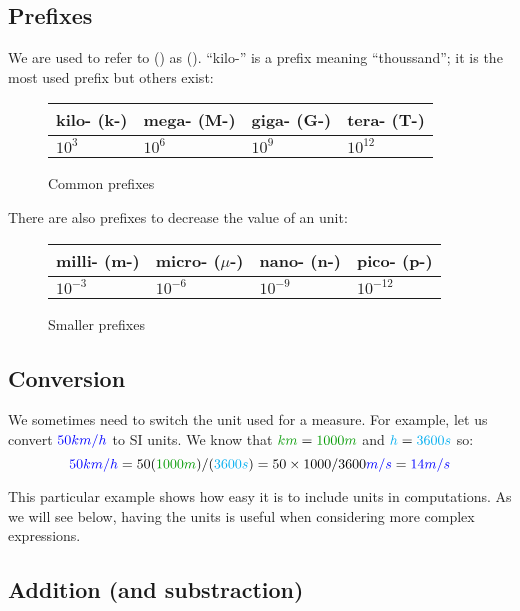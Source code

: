 \subsection{Prefixes}

We are used to refer to  () as  (). “kilo-” is a prefix meaning “thoussand”;
it is the most used prefix but others exist:

\begin{figure}[H]
	\centering
	\begin{tabular}{l|l|l|l}
		kilo- (k-) & mega- (M-) & giga- (G-) & tera- (T-) \\
		\hline
		$10^3$     & $10^6$     & $10^9$     & $10^{12}$  \\
	\end{tabular}
	\caption{Common prefixes}
\end{figure}

\begin{remark}
There are also prefixes to decrease the value of an unit:

\begin{figure}[H]
	\centering
	\begin{tabular}{l|l|l|l}
		milli- (m-) & micro- ($\mu$-) & nano- (n-) & pico- (p-) \\
		\hline
		$10^{-3}$   & $10^{-6}$       & $10^{-9}$  & $10^{-12}$ \\
	\end{tabular}
	\caption{Smaller prefixes}
\end{figure}
\end{remark}


\subsection{Conversion}

We sometimes need to switch the unit used for a measure. For example,
let us convert $\textcolor{blue}{50 km/h}$ to SI units. We know that $\dist{km} = \dist{1000 m}$ and $\textcolor{cyan}{h} =
\textcolor{cyan}{3600 s}$ so:
\[
\speed{50 km/h}
= 50 (\dist{1000m})/(\delay{3600s})
= 50 \times 1000 / 3600 \speed{m/s}
= \speed{14 m/s}
\]

This particular example shows how easy it is to include units in
computations. As we will see below, having the units is useful when
considering more complex expressions.


\subsection{Addition (and substraction)}

